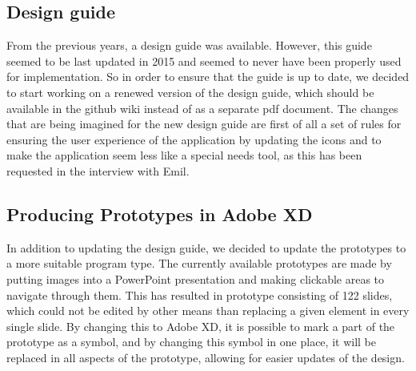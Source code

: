 \subsection{Design guide}
From the previous years, a design guide was available.
However, this guide seemed to be last updated in 2015 and seemed to never have been properly used for implementation.
So in order to ensure that the guide is up to date, we decided to start working on a renewed version of the design guide, which should be available in the github wiki instead of as a separate pdf document.
The changes that are being imagined for the new design guide are first of all a set of rules for ensuring the user experience of the application by updating the icons and to make the application seem less like a special needs tool, as this has been requested in the interview with Emil.

\subsection{Producing Prototypes in Adobe XD}
In addition to updating the design guide, we decided to update the prototypes to a more suitable program type.
The currently available prototypes are made by putting images into a PowerPoint presentation and making clickable areas to navigate through them.
This has resulted in prototype consisting of 122 slides, which could not be edited by other means than replacing a given element in every single slide.
By changing this to Adobe XD, it is possible to mark a part of the prototype as a symbol, and by changing this symbol in one place, it will be replaced in all aspects of the prototype, allowing for easier updates of the design.
